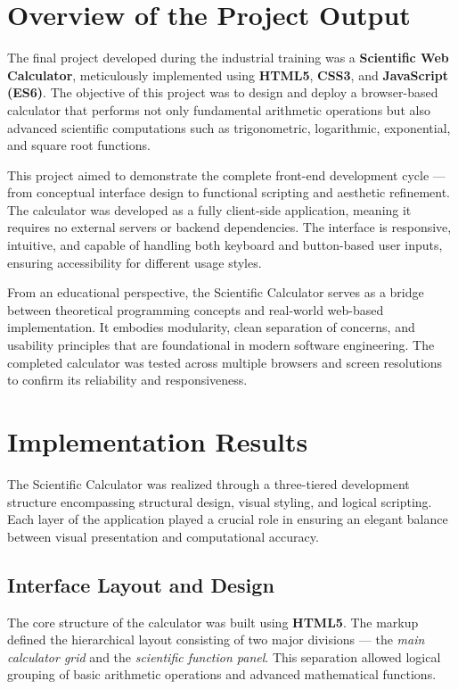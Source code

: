 \documentclass[a4paper,12pt,oneside]{report}
\numberwithin{equation}{chapter}
\numberwithin{figure}{chapter}
\numberwithin{table}{chapter}
\begin{document}
\section{Overview of the Project Output}

The final project developed during the industrial training was a \textbf{Scientific Web Calculator}, meticulously implemented using \textbf{HTML5}, \textbf{CSS3}, and \textbf{JavaScript (ES6)}. The objective of this project was to design and deploy a browser-based calculator that performs not only fundamental arithmetic operations but also advanced scientific computations such as trigonometric, logarithmic, exponential, and square root functions. 

This project aimed to demonstrate the complete front-end development cycle — from conceptual interface design to functional scripting and aesthetic refinement. The calculator was developed as a fully client-side application, meaning it requires no external servers or backend dependencies. The interface is responsive, intuitive, and capable of handling both keyboard and button-based user inputs, ensuring accessibility for different usage styles.

From an educational perspective, the Scientific Calculator serves as a bridge between theoretical programming concepts and real-world web-based implementation. It embodies modularity, clean separation of concerns, and usability principles that are foundational in modern software engineering. The completed calculator was tested across multiple browsers and screen resolutions to confirm its reliability and responsiveness.

\bigskip
\noindent
\section{Implementation Results}

The Scientific Calculator was realized through a three-tiered development structure encompassing structural design, visual styling, and logical scripting. Each layer of the application played a crucial role in ensuring an elegant balance between visual presentation and computational accuracy.

\subsection{Interface Layout and Design}

The core structure of the calculator was built using \textbf{HTML5}. The markup defined the hierarchical layout consisting of two major divisions — the \textit{main calculator grid} and the \textit{scientific function panel}. This separation allowed logical grouping of basic arithmetic operations and advanced mathematical functions.
\end{document}
